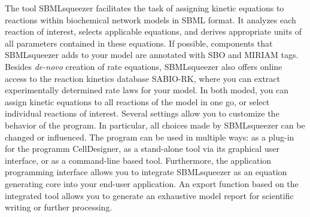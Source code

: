 The tool SBMLsqueezer facilitates the task of assigning kinetic equations to
reactions within biochemical network models in SBML format.
It analyzes each reaction of interest, selects applicable equations, and derives
appropriate units of all parameters contained in these equations.
If possible, components that SBMLsqueezer adds to your model are annotated with
SBO and MIRIAM tags.
Besides \emph{de-novo} creation of rate equations, SBMLsqueezer also offers
online access to the reaction kinetics database SABIO-RK, where you can extract
experimentally determined rate laws for your model.
In both moded, you can assign kinetic equations to all reactions of the model in
one go, or select individual reactions of interest. 
Several settings allow you to customize the behavior of the program.
In particular, all choices made by SBMLsqueezer can be changed or influenced.
The program can be used in multiple ways: as a plug-in for the programm
CellDesigner, as a stand-alone tool via its graphical user interface, or as a
command-line based tool.
Furthermore, the application programming interface allows you to integrate
SBMLsqueezer as an equation generating core into your end-user application.
An export function based on the integrated tool \SBMLLaTeX{} allows you to
generate an exhaustive model report for scientific writing or further
processing.
